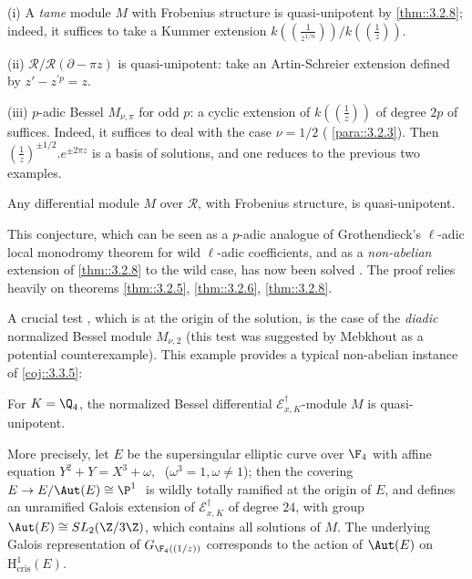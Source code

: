  \medskip{} (i) A {\it tame} module $M$
 with Frobenius structure is quasi-unipotent by \ref{thm::3.2.8}; indeed, it
 suffices to take a Kummer extension
 $k((\frac{1}{z^{1/n}}))/k((\frac{1}{z}))$. 

 (ii) $\mathcal{R}/\mathcal{R}(\partial-\pi z)$ is
 quasi-unipotent: take an Artin-Schreier extension defined by
 $z'-z^{\prime p}=z$.

 (iii) $p$-adic Bessel $M_{\nu,\pi}$ for odd $p$: a cyclic
 extension of $k((\frac{1}{z}))$ of degree $2p$ of 
 suffices. Indeed, it suffices to deal with the case $\nu = 1/2$ (\cf
\ref{para::3.2.3}). Then $(\frac{1}{z})^{\pm 1/2}.e^{\pm 2\pi z}$ is a
basis of solutions, and one reduces to the previous two examples.

\begin{coj}\label{coj::3.3.5}
 Any differential module $M$ over $\mathcal{R}$, with Frobenius structure, is
 quasi-unipotent.
\end{coj}

This conjecture, which can be seen as a $p$-adic analogue of
Grothendieck's $\ell$-adic local monodromy theorem for wild $\ell$-adic
coefficients, and as a {\it non-abelian} extension of
\ref{thm::3.2.8} to the wild case, has now been solved
\cite{andre01:_filtr_hasse_arf}.
The proof relies heavily 
on theorems \ref{thm::3.2.5}, \ref{thm::3.2.6}, \ref{thm::3.2.8}.

\medskip\noindent A crucial test \cite{andre:_repres_bessel}, which is
at the origin 
of the solution, is the case of the {\it diadic} normalized Bessel
module $M_{\nu,2}$ (this test was suggested by Mebkhout as a potential
counterexample). This example provides a typical non-abelian instance of
\ref{coj::3.3.5}:

\begin{thm}\label{thm::3.3.6} For $K=\Q_4$, the normalized Bessel
 differential $\mathcal{E}^\dagger_{x,K}$-module $M$ is 
 quasi-unipotent.
\end{thm}

\medskip More precisely, let $E$ be the supersingular elliptic curve
 over $\F_4$ with affine equation 
  $Y^2+Y=X^3+\omega,\;$ ($\omega^3=1, \omega\neq 1$); then the covering
 $E\to E/\Aut(E)\cong \P^1\;$ is wildly totally ramified at the origin
 of $E$, and defines an unramified Galois extension of
 $\mathcal{E}^\dagger_{x,K}$ of degree $24$, with group $\Aut(E)\cong
 SL_2(\Z/3\Z)$, which contains all solutions of $M$. The underlying
 Galois representation of $G_{\F_4((1/z))}$ corresponds to the action of
 $\Aut(E)$ on $\mathrm{H}^1_{\mathrm{cris}}(E)$.



